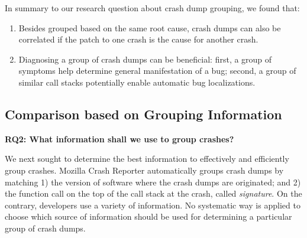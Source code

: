 \documentclass{llncs}
\newcommand{\todo}[1]{\textcolor{cyan}{\textbf{[#1]}}}
\begin{document}
In summary to our research question about crash dump grouping, we found that:

\begin{enumerate}
\item Besides grouped based on the same root cause, crash dumps can also be correlated if the patch to one crash is the cause for another crash.
\item Diagnosing a group of crash dumps can be beneficial: first, a group of symptoms help determine general manifestation of a bug; second, a group of similar call stacks potentially enable automatic bug localizations.
\end{enumerate}








\subsection{Comparison based on Grouping Information}

\textbf{RQ2: What information shall we use to group crashes?}



We next sought to determine the best information to effectively and efficiently group crashes. Mozilla Crash Reporter automatically groups crash dumps by matching 1) the version of software where the crash dumps are originated; and 2) the function call on the top of the call stack at the crash, called {\it signature}. On the contrary, developers use a variety of information. No systematic way is applied to choose which source of information should be used for determining a particular group of crash dumps. %
\end{document}
